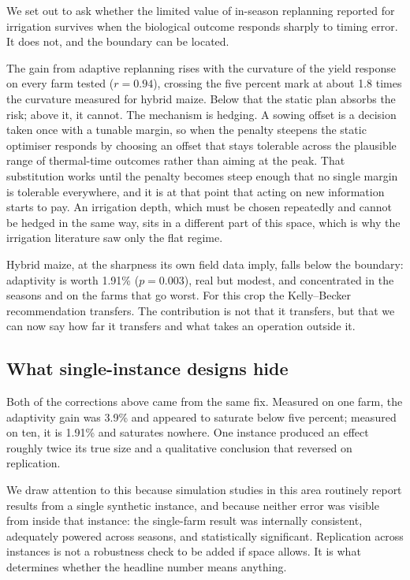 
We set out to ask whether the limited value of in-season replanning reported
for irrigation survives when the biological outcome responds sharply to
timing error. It does not, and the boundary can be located.

The gain from adaptive replanning rises with the curvature of the yield
response on every farm tested ($r = 0.94$), crossing the five percent
mark at about 1.8 times the curvature measured for hybrid maize.
Below that the static plan absorbs the risk; above it, it cannot. The
mechanism is hedging. A sowing offset is a decision taken once with a tunable
margin, so when the penalty steepens the static optimiser responds by
choosing an offset that stays tolerable across the plausible range of
thermal-time outcomes rather than aiming at the peak. That substitution works
until the penalty becomes steep enough that no single margin is tolerable
everywhere, and it is at that point that acting on new information starts to
pay. An irrigation depth, which must be chosen repeatedly and cannot be
hedged in the same way, sits in a different part of this space, which is why
the irrigation literature saw only the flat regime.

Hybrid maize, at the sharpness its own field data imply, falls below the
boundary: adaptivity is worth 1.91\% ($p = 0.003$), real but modest, and
concentrated in the seasons and on the farms that go worst. For this crop the
Kelly--Becker recommendation transfers. The contribution is not that it
transfers, but that we can now say how far it transfers and what takes an
operation outside it.

\subsection{What single-instance designs hide}

Both of the corrections above came from the same fix. Measured on one farm,
the adaptivity gain was 3.9\% and appeared to saturate below five
percent; measured on ten, it is 1.91\% and saturates nowhere. One
instance produced an effect roughly twice its true size and a qualitative
conclusion that reversed on replication.

We draw attention to this because simulation studies in this area routinely
report results from a single synthetic instance, and because neither error
was visible from inside that instance: the single-farm result was internally
consistent, adequately powered across seasons, and statistically significant.
Replication across instances is not a robustness check to be added if space
allows. It is what determines whether the headline number means anything.


